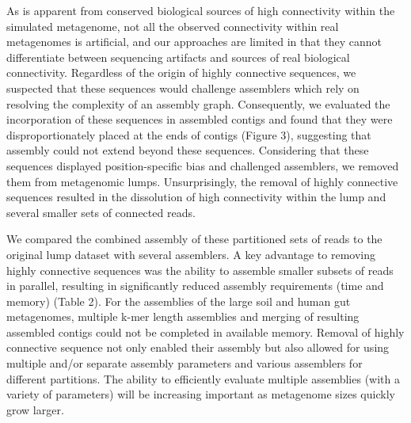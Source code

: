 \documentclass[11pt]{article} %
\begin{document}
As is apparent from conserved biological sources of high connectivity within the simulated metagenome, not all the observed connectivity within real metagenomes is artificial, and our approaches are limited in that they cannot differentiate between sequencing artifacts and sources of real biological connectivity.  Regardless of the origin of highly connective sequences, we suspected that these sequences would challenge assemblers which rely on resolving the complexity of an assembly graph.  Consequently, we evaluated the incorporation of these sequences in assembled contigs and found that they were disproportionately placed at the ends of contigs (Figure 3), suggesting that assembly could not extend beyond these sequences.  Considering that these sequences displayed position-specific bias and challenged assemblers, we removed them from metagenomic lumps.  Unsurprisingly, the removal of highly connective sequences resulted in the dissolution of high connectivity within the lump and several smaller sets of connected reads.  

We compared the combined assembly of these partitioned sets of reads to the original lump dataset with several assemblers.  A key advantage to removing highly connective sequences was the ability to assemble smaller subsets of reads in parallel, resulting in significantly reduced assembly requirements (time and memory) (Table 2).  For the assemblies of the large soil and human gut metagenomes, multiple k-mer length assemblies and merging of resulting assembled contigs could not be completed in available memory.  Removal of highly connective sequence not only enabled their assembly but also allowed for using multiple and/or separate assembly parameters and various assemblers for different partitions.  The ability to efficiently evaluate multiple assemblies (with a variety of parameters) will be increasing important as metagenome sizes quickly grow larger. 
\end{document}
